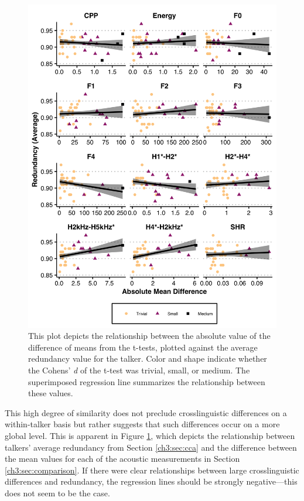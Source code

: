 \begin{figure}[htbp]
    \begin{center}
    \includegraphics[width=0.9\linewidth]{figures/ch3_redundancybyttestdiff_5in.png} 
    \caption{This plot depicts the relationship between the absolute value of the difference of means from the t-tests, plotted against the average redundancy value for the talker. Color and shape indicate whether the Cohens' \textit{d} of the t-test was trivial, small, or medium. The superimposed regression line summarizes the relationship between these values. }
    \label{ch3:fig:diffbyred}
    \end{center}
\end{figure}

This high degree of similarity does not preclude crosslinguistic differences on a within-talker basis but rather suggests that such differences occur on a more global level. This is apparent in Figure \ref{ch3:fig:diffbyred}, which depicts the relationship between talkers' average redundancy from Section \ref{ch3:sec:cca} and the difference between the mean values for each of the acoustic measurements in Section \ref{ch3:sec:comparison}. If there were clear relationships between large crosslinguistic differences and redundancy, the regression lines should be strongly negative---this does not seem to be the case.

